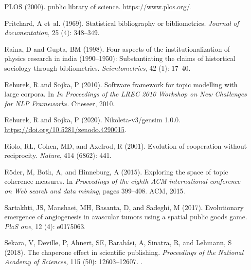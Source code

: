 \documentclass{article}
\theoremstyle{definition}
\begin{document}
\begin{thebibliography}{71}
    PLOS (2000).
     public library of science.
    \newblock \url{https://www.plos.org/}.
    
    Pritchard, A et~al. (1969).
    \newblock Statistical bibliography or bibliometrics.
    \newblock \emph{Journal of documentation}, 25 (4): 348--349.
    
    Raina, D and Gupta, BM (1998).
    \newblock Four aspects of the institutionalization of physics research in india
      (1990--1950): Substantiating the claims of histortical sociology through
      bibliometrics.
    \newblock \emph{Scientometrics}, 42 (1): 17--40.
    
    Rehurek, R and Sojka, P (2010).
    \newblock Software framework for topic modelling with large corpora.
    \newblock In \emph{In Proceedings of the LREC 2010 Workshop on New Challenges
      for NLP Frameworks}. Citeseer, 2010.
    
    Rehurek, R and Sojka, P (2020).
    \newblock Nikoleta-v3/gensim 1.0.0.
    \newblock \url{https://doi.org/10.5281/zenodo.4290015}.
    
    Riolo, RL, Cohen, MD, and Axelrod, R (2001).
    \newblock Evolution of cooperation without reciprocity.
    \newblock \emph{Nature}, 414 (6862): 441.
    
    R{\"o}der, M, Both, A, and Hinneburg, A (2015).
    \newblock Exploring the space of topic coherence measures.
    \newblock In \emph{Proceedings of the eighth ACM international conference on
      Web search and data mining}, pages 399--408. ACM, 2015.
    
    Sartakhti, JS, Manshaei, MH, Basanta, D, and Sadeghi, M (2017).
    \newblock Evolutionary emergence of angiogenesis in avascular tumors using a
      spatial public goods game.
    \newblock \emph{PloS one}, 12 (4): e0175063.
    
    Sekara, V, Deville, P, Ahnert, SE, Barab{\'a}si, A, Sinatra, R, and Lehmann, S
      (2018).
    \newblock The chaperone effect in scientific publishing.
    \newblock \emph{Proceedings of the National Academy of Sciences}, 115
      (50): 12603--12607.
    \newblock {}.
    

\end{thebibliography}
\end{document}
